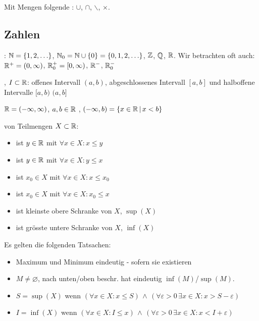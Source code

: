 \Def Mit Mengen folgende :
$\cup$, $\cap$, $\backslash$, $\times$.

\subsection{Zahlen}

\Def {}: $\mathbb{N} = \{1, 2, \ldots\}$, $\mathbb{N}_0 = \mathbb{N} \cup \{0\} = \{0, 1, 2, \ldots\}$, $\mathbb{Z}$, $\mathbb{Q}$, $\mathbb{R}$.
Wir betrachten oft auch: $\mathbb{R}^+ = (0, \infty)$, $\mathbb{R}^+_0 = [0, \infty)$, $\mathbb{R}^-$, $\mathbb{R}^-_0$


\Def {}, $I \subset \mathbb{R}$:
offenes Intervall $(a, b)$, abgeschlossenes Intervall $[a, b]$ und halboffene Intervalle $[a, b)$ $(a, b]$

$\mathbb{R} = (-\infty, \infty)$, $a, b \in \mathbb{R}$ ,
$(-\infty, b) = \{x \in \mathbb{R} \, | \, x < b\}$

\Def {} von Teilmengen $X \subset \mathbb{R}$:
\vspace{-0.6em}
\begin{itemize}
    \item {} ist $y \in \mathbb{R}$ mit $\forall x \in X : x\le y$
    \item {} ist $y \in \mathbb{R}$ mit $\forall x \in X : y\le x$
    \item {} ist $x_0 \in X$ mit $\forall x \in X : x\le x_0$
    \item {} ist $x_0 \in X$ mit $\forall x \in X : x_0\le x$
    \item {} ist kleinste obere Schranke von $X$, $\sup(X)$
    \item {} ist grösste untere Schranke von $X$, $\inf(X)$
\end{itemize}

\Satz
Es gelten die folgenden Tatsachen:
\vspace{-0.6em}
\begin{itemize}
    \item Maximum und Minimum eindeutig - sofern sie existieren
    \item $M\ne \varnothing$, nach unten/oben beschr. hat eindeutig $\inf(M)$/$\sup(M)$.
    \item $S = \sup(X)$ wenn $(\forall x \in X : x\le S) \, \land \, (\forall \varepsilon > 0 \, \exists x \in X : x > S - \varepsilon)$
    \item $I = \inf(X)$ wenn $(\forall x \in X : I\le x) \, \land \, (\forall \varepsilon > 0 \, \exists x \in X : x < I + \varepsilon)$
\end{itemize}


